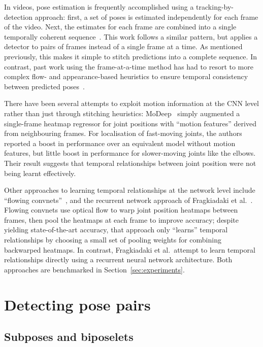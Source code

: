 \documentclass[runningheads]{llncs}
\begin{document}
In videos, pose estimation is frequently accomplished using a
tracking-by-detection approach: first, a set of poses is estimated independently
for each frame of the video. Next, the estimates for each frame are combined
into a single temporally coherent
sequence~\cite{andriluka2010monocular,ferrari2008progressive,cherian2014mixing,ramanan2005strike}.
This work follows a similar pattern, but applies a detector to pairs of frames
instead of a single frame at a time. As mentioned previously, this makes it
simple to stitch predictions into a complete sequence. In contrast, past work
using the frame-at-a-time method has had to resort to more complex flow- and
appearance-based heuristics to ensure temporal consistency between predicted
poses~\cite{cherian2014mixing}.

There have been several attempts to exploit motion information at the CNN level
rather than just through stitching heuristics: MoDeep~\cite{jain2014modeep}
simply augmented a single-frame heatmap regressor for joint positions with
``motion features'' derived from neighbouring frames. For localisation of
fast-moving joints, the authors reported a boost in performance over an
equivalent model without motion features, but little boost in performance for
slower-moving joints like the elbows. Their result suggests that temporal
relationships between joint position were not being learnt effectively.

Other approaches to learning temporal relationships at the network level include
``flowing convnets''~\cite{pfister2015flowing}, and the recurrent network
approach of Fragkiadaki et al.~\cite{fragkiadaki2015recurrent}. Flowing convnets
use optical flow to warp joint position heatmaps between frames, then pool the
heatmaps at each frame to improve accuracy; despite yielding state-of-the-art
accuracy, that approach only ``learns'' temporal relationships by choosing a
small set of pooling weights for combining backwarped heatmaps. In contrast,
Fragkiadaki et al.\ attempt to learn temporal relationships directly using a
recurrent neural network architecture. Both approaches are benchmarked in
Section~\ref{sec:experiments}.

\section{Detecting pose pairs}\label{sec:pair-dets}

\subsection{Subposes and biposelets}\label{sec:decomp}
\end{document}
